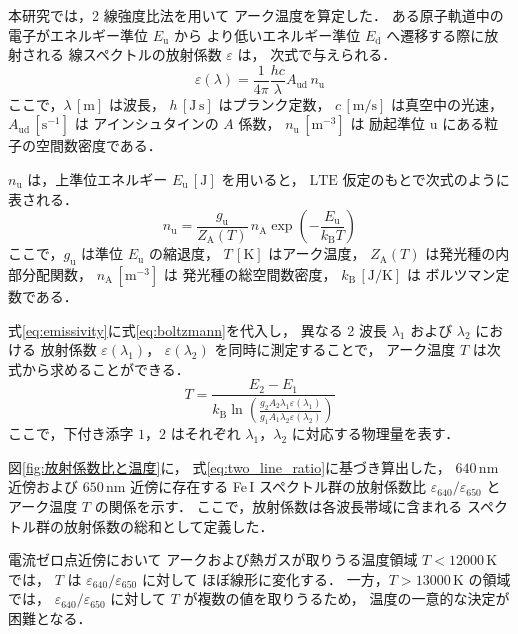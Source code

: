 \documentclass[dvipdfmx,report,uplatex]{jsbook}
\numberwithin{equation}{section}
\numberwithin{figure}{section}
\numberwithin{table}{section}
\begin{document}
本研究では，2 線強度比法\cite{boulos2013thermal}を用いて
アーク温度を算定した．
ある原子軌道中の電子がエネルギー準位 $E_{\mathrm{u}}$ から
より低いエネルギー準位 $E_{\mathrm{d}}$ へ遷移する際に放射される
線スペクトルの放射係数 $\varepsilon$ は，
次式で与えられる．
\begin{equation}
\varepsilon(\lambda)
= \frac{1}{4\pi}\frac{hc}{\lambda}
A_{\mathrm{u}\mathrm{d}}\, n_{\mathrm{u}}
\label{eq:emissivity}
\end{equation}
ここで，$\lambda\,[\mathrm{m}]$ は波長，
$h\,[\mathrm{J\,s}]$ はプランク定数，
$c\,[\mathrm{m/s}]$ は真空中の光速，
$A_{\mathrm{u}\mathrm{d}}\,[\mathrm{s^{-1}}]$ は
アインシュタインの $A$ 係数，
$n_{\mathrm{u}}\,[\mathrm{m^{-3}}]$ は
励起準位 $\mathrm{u}$ にある粒子の空間数密度である．

$n_{\mathrm{u}}$ は，上準位エネルギー
$E_{\mathrm{u}}\,[\mathrm{J}]$ を用いると，
$\mathrm{LTE}$ 仮定のもとで次式のように表される．
\begin{equation}
n_{\mathrm{u}}
= \frac{g_{\mathrm{u}}}{Z_{\mathrm{A}}(T)}\, n_{\mathrm{A}}
\exp\!\left(-\frac{E_{\mathrm{u}}}{k_{\mathrm{B}} T}\right)
\label{eq:boltzmann}
\end{equation}
ここで，$g_{\mathrm{u}}$ は準位 $E_{\mathrm{u}}$ の縮退度，
$T\,[\mathrm{K}]$ はアーク温度，
$Z_{\mathrm{A}}(T)$ は発光種の内部分配関数，
$n_{\mathrm{A}}\,[\mathrm{m^{-3}}]$ は
発光種の総空間数密度，
$k_{\mathrm{B}}\,[\mathrm{J/K}]$ は
ボルツマン定数である．

式\eqref{eq:emissivity}に式\eqref{eq:boltzmann}を代入し，
異なる 2 波長 $\lambda_1$ および $\lambda_2$ における
放射係数 $\varepsilon(\lambda_1)$，
$\varepsilon(\lambda_2)$ を同時に測定することで，
アーク温度 $T$ は次式から求めることができる．
\begin{equation}
T
= \frac{E_2 - E_1}
{k_{\mathrm{B}}
\ln\!\left(
\frac{
g_2 A_2 \lambda_1 \varepsilon(\lambda_1)
}{
g_1 A_1 \lambda_2 \varepsilon(\lambda_2)
}
\right)}
\label{eq:two_line_ratio}
\end{equation}
ここで，下付き添字 $\mathrm{1}$，$\mathrm{2}$ はそれぞれ
$\lambda_1$，$\lambda_2$ に対応する物理量を表す．

図\ref{fig:放射係数比と温度}に，
式\eqref{eq:two_line_ratio}に基づき算出した，
$640\,\mathrm{nm}$ 近傍および
$650\,\mathrm{nm}$ 近傍に存在する
Fe\,I スペクトル群の放射係数比
$\varepsilon_{640}/\varepsilon_{650}$ と
アーク温度 $T$ の関係を示す．
ここで，放射係数は各波長帯域に含まれる
スペクトル群の放射係数の総和として定義した．

電流ゼロ点近傍において
アークおよび熱ガスが取りうる温度領域
$T < 12000\,\mathrm{K}$ では，
$T$ は $\varepsilon_{640}/\varepsilon_{650}$ に対して
ほぼ線形に変化する．
一方，$T > 13000\,\mathrm{K}$ の領域では，
$\varepsilon_{640}/\varepsilon_{650}$ に対して
$T$ が複数の値を取りうるため，
温度の一意的な決定が困難となる．
\end{document}
